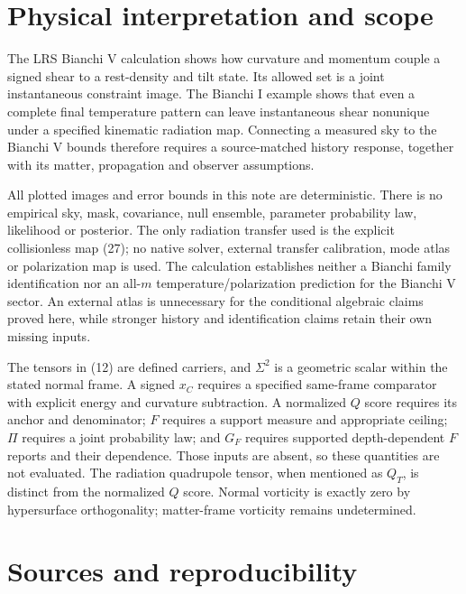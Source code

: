 \documentclass[aps,prd,reprint,onecolumn,nofootinbib]{revtex4-2}
\begin{document}
\hypertarget{physical-interpretation-and-scope}{%
\section{Physical interpretation and scope}\label{physical-interpretation-and-scope}}

The LRS Bianchi V calculation shows how curvature and momentum couple a signed shear to a rest-density and tilt state. Its allowed set is a joint instantaneous constraint image. The Bianchi I example shows that even a complete final temperature pattern can leave instantaneous shear nonunique under a specified kinematic radiation map. Connecting a measured sky to the Bianchi V bounds therefore requires a source-matched history response, together with its matter, propagation and observer assumptions.

All plotted images and error bounds in this note are deterministic. There is no empirical sky, mask, covariance, null ensemble, parameter probability law, likelihood or posterior. The only radiation transfer used is the explicit collisionless map (27); no native solver, external transfer calibration, mode atlas or polarization map is used. The calculation establishes neither a Bianchi family identification nor an all-\(m\) temperature/polarization prediction for the Bianchi V sector. An external atlas is unnecessary for the conditional algebraic claims proved here, while stronger history and identification claims retain their own missing inputs.

The tensors in (12) are defined carriers, and \(\Sigma^2\) is a geometric scalar within the stated normal frame. A signed \(x_C\) requires a specified same-frame comparator with explicit energy and curvature subtraction. A normalized \(Q\) score requires its anchor and denominator; \(F\) requires a support measure and appropriate ceiling; \(\Pi\) requires a joint probability law; and \(G_F\) requires supported depth-dependent \(F\) reports and their dependence. Those inputs are absent, so these quantities are not evaluated. The radiation quadrupole tensor, when mentioned as \(Q_T\), is distinct from the normalized \(Q\) score. Normal vorticity is exactly zero by hypersurface orthogonality; matter-frame vorticity remains undetermined.



\hypertarget{sources-and-reproducibility}{%
\section{Sources and reproducibility}\label{sources-and-reproducibility}}
\end{document}
